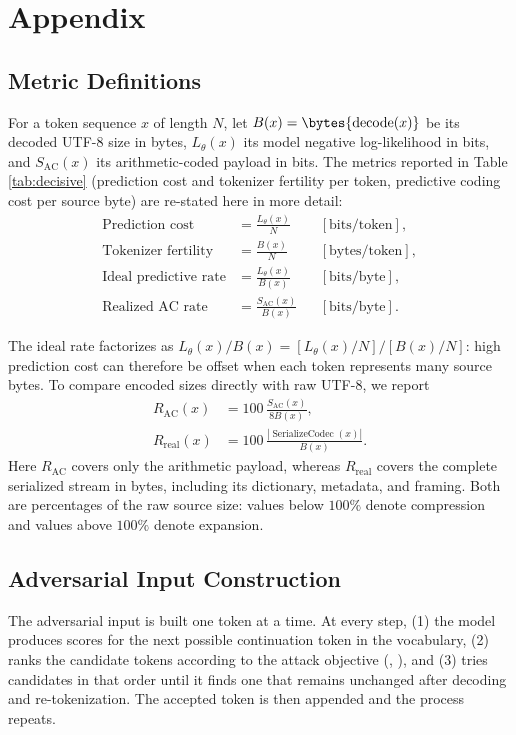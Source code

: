 \section{Appendix}

\subsection{Metric Definitions}
For a token sequence $x$ of length $N$, let $B(x)=\bytes{\operatorname{decode}(x)}$ be its decoded UTF-8 size in bytes, $L_\theta(x)$ its model negative log-likelihood in bits, and $S_{\mathrm{AC}}(x)$ its arithmetic-coded payload in bits. The metrics reported in Table \ref{tab:decisive} (prediction cost and tokenizer fertility per token, predictive coding cost per source byte) are re-stated here in more detail:
\begin{align}
  \text{Prediction cost} &= \frac{L_\theta(x)}{N}
    && [\mathrm{bits/token}],\\
  \text{Tokenizer fertility} &= \frac{B(x)}{N}
    && [\mathrm{bytes/token}],\\
  \text{Ideal predictive rate} &= \frac{L_\theta(x)}{B(x)}
    && [\mathrm{bits/byte}],\\
  \text{Realized AC rate} &= \frac{S_{\mathrm{AC}}(x)}{B(x)}
    && [\mathrm{bits/byte}].
\end{align}

The ideal rate factorizes as
$L_\theta(x)/B(x)=[L_\theta(x)/N]/[B(x)/N]$: high prediction cost can therefore
be offset when each token represents many source bytes. To compare encoded
sizes directly with raw UTF-8, we report
\begin{align}
  R_{\mathrm{AC}}(x)
    &=100\,\frac{S_{\mathrm{AC}}(x)}{8B(x)},\\
  R_{\mathrm{real}}(x)
    &=100\,\frac{\left|\operatorname{SerializeCodec}(x)\right|}{B(x)}.
\end{align}
Here $R_{\mathrm{AC}}$ covers only the arithmetic payload, whereas
$R_{\mathrm{real}}$ covers the complete serialized stream in bytes, including
its dictionary, metadata, and framing. Both are percentages of the raw source
size: values below $100\%$ denote compression and values above $100\%$ denote
expansion.

\subsection{Adversarial Input Construction}
\label{app:attack-algorithms}

The adversarial input is built one token at a time. At every step, (1) the model produces scores for the next possible continuation token in the vocabulary, (2) ranks the candidate tokens according to the attack objective (\MinProb{}, \MaxSurprisal{}), and (3) tries candidates in that order until it finds one
that remains unchanged after decoding and re-tokenization. The accepted token is
then appended and the process repeats.

